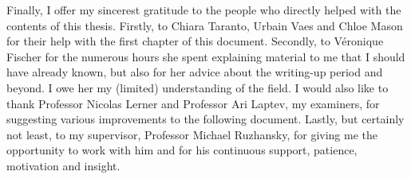 Finally, I offer my sincerest gratitude to the people who directly helped with the contents of this thesis.
Firstly, to Chiara Taranto, Urbain Vaes and Chloe Mason
for their help with the first chapter of this document.
Secondly, to V\'eronique Fischer for the numerous hours she spent
explaining material to me that I should have already known,
but also for her advice about the writing-up period and beyond.
I owe her my (limited) understanding of the field.
I would also like to thank Professor Nicolas Lerner and Professor Ari Laptev,
my examiners,
for suggesting various improvements to the following document.
Lastly, but certainly not least,
to my supervisor,
Professor Michael Ruzhansky,
for giving me the opportunity to work with him and for his continuous support, patience, motivation and insight.
